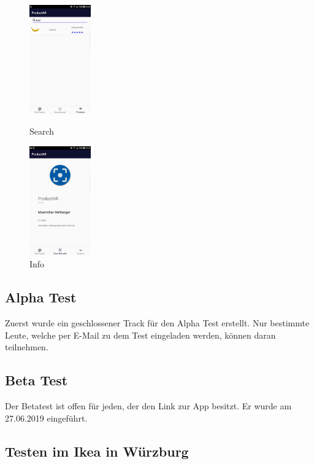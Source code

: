 \documentclass{scrartcl}
\begin{document}
\begin{figure}[h]
   \begin{minipage}[b]{.2\linewidth} %
      \includegraphics[width=100px]{img/screenshots/screenshot_7.png}
      \caption{Search}
   \end{minipage}
   \hspace{.1\linewidth}%
   \begin{minipage}[b]{.2\linewidth} %
      \includegraphics[width=100px]{img/screenshots/screenshot_8.png}
      \caption{Info}
   \end{minipage}
\end{figure}

\subsection{Alpha Test}

Zuerst wurde ein geschlossener Track für den Alpha Test erstellt. Nur bestimmte Leute, welche per E-Mail zu dem Test eingeladen werden, können daran teilnehmen.

\subsection{Beta Test}

Der Betatest ist offen für jeden, der den Link zur App besitzt. Er wurde am 27.06.2019 eingeführt. 

\subsection{Testen im Ikea in Würzburg}
\end{document}
